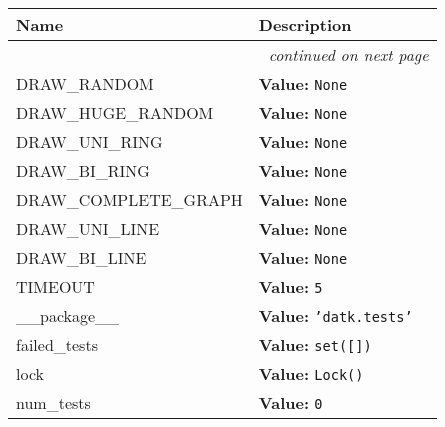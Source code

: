     \vspace{-1cm}
\hspace{\varindent}\begin{longtable}{|p{\varnamewidth}|p{\vardescrwidth}|l}
\cline{1-2}
\cline{1-2} \centering \textbf{Name} & \centering \textbf{Description}& \\
\cline{1-2}
\endhead\cline{1-2}\multicolumn{3}{r}{\small\textit{continued on next page}}\\\endfoot\cline{1-2}
\endlastfoot\raggedright D\-R\-A\-W\-\_\-R\-A\-N\-D\-O\-M\- & \raggedright \textbf{Value:} 
{\tt None}&\\
\cline{1-2}
\raggedright D\-R\-A\-W\-\_\-H\-U\-G\-E\-\_\-R\-A\-N\-D\-O\-M\- & \raggedright \textbf{Value:} 
{\tt None}&\\
\cline{1-2}
\raggedright D\-R\-A\-W\-\_\-U\-N\-I\-\_\-R\-I\-N\-G\- & \raggedright \textbf{Value:} 
{\tt None}&\\
\cline{1-2}
\raggedright D\-R\-A\-W\-\_\-B\-I\-\_\-R\-I\-N\-G\- & \raggedright \textbf{Value:} 
{\tt None}&\\
\cline{1-2}
\raggedright D\-R\-A\-W\-\_\-C\-O\-M\-P\-L\-E\-T\-E\-\_\-G\-R\-A\-P\-H\- & \raggedright \textbf{Value:} 
{\tt None}&\\
\cline{1-2}
\raggedright D\-R\-A\-W\-\_\-U\-N\-I\-\_\-L\-I\-N\-E\- & \raggedright \textbf{Value:} 
{\tt None}&\\
\cline{1-2}
\raggedright D\-R\-A\-W\-\_\-B\-I\-\_\-L\-I\-N\-E\- & \raggedright \textbf{Value:} 
{\tt None}&\\
\cline{1-2}
\raggedright T\-I\-M\-E\-O\-U\-T\- & \raggedright \textbf{Value:} 
{\tt 5}&\\
\cline{1-2}
\raggedright \_\-\_\-p\-a\-c\-k\-a\-g\-e\-\_\-\_\- & \raggedright \textbf{Value:} 
{\tt \texttt{'}\texttt{datk.tests}\texttt{'}}&\\
\cline{1-2}
\raggedright f\-a\-i\-l\-e\-d\-\_\-t\-e\-s\-t\-s\- & \raggedright \textbf{Value:} 
{\tt \texttt{set([}\texttt{])}}&\\
\cline{1-2}
\raggedright l\-o\-c\-k\- & \raggedright \textbf{Value:} 
{\tt Lock()}&\\
\cline{1-2}
\raggedright n\-u\-m\-\_\-t\-e\-s\-t\-s\- & \raggedright \textbf{Value:} 
{\tt 0}&\\
\cline{1-2}
\end{longtable}

